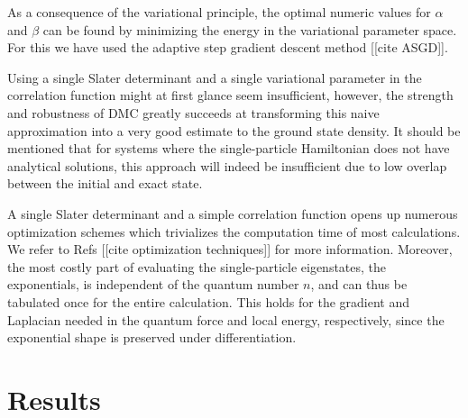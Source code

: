 As a consequence of the variational principle, the optimal numeric values for $\alpha$ and $\beta$ can be found by minimizing the energy in the variational parameter space.  For this we have used the adaptive step gradient descent method [[cite ASGD]].

Using a single Slater determinant and a single variational parameter in the correlation function might at first glance seem insufficient,
however, the strength and robustness of DMC greatly succeeds at transforming this naive approximation into a very good estimate to the ground
state density. It should be mentioned that for systems where the single-particle Hamiltonian does not have analytical solutions, this approach
will indeed be insufficient due to low overlap between the initial and exact state.

A single Slater determinant and a simple correlation function opens up numerous optimization schemes which trivializes the computation time of most calculations.  We refer to Refs [[cite optimization techniques]] for more information.  Moreover, the most costly part of evaluating the single-particle eigenstates, the exponentials, is independent of the quantum number $n$, and can thus be tabulated once for the entire calculation. This holds for the gradient and Laplacian needed in the quantum force and local energy, respectively, since the exponential shape is preserved under differentiation.

\section{Results}
\label{sec:results}

